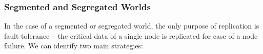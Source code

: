 \documentclass[a4paper, 10pt]{book}
\begin{document}
            \subsubsection{Segmented and Segregated Worlds}

            In the case of a segmented or segregated world, the only purpose of
            replication is fault-tolerance -- the critical data of a single node
            is replicated for case of a node failure.
            We can identify two main strategies:
\end{document}
